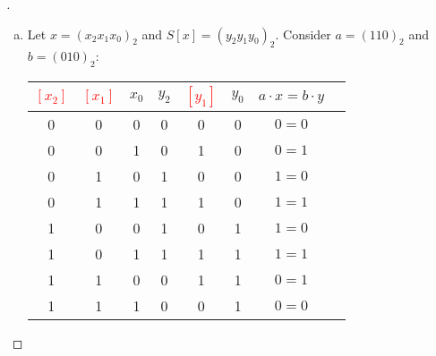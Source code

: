 \begin{enumerate}[\bf 1.]
\begin{proof}[\sol]
\begin{enumerate}[(a)]
			\newpage
			\item Let $x=(x_2x_1x_0)_2$ and $S[x]=(y_2y_1y_0)_2$. Consider $a=(110)_2$ and $b=(010)_2$: 
%					
%					
%					
%					
			\begin{table}[h!]\centering\renewcommand{\arraystretch}{1}
				\begin{tabular}{ccc|ccc|cc}
					\toprule[1.2pt]
					\textcolor{red}{$[x_2]$} & \textcolor{red}{$[x_1]$} & $x_0$ & $y_2$ & \textcolor{red}{$[y_1]$} & {$y_0$} & $a\cdot x=b\cdot y$ & \\
					\hline
					0 & 0 & 0 & 0 & 0 & 0 & $0=0$ & \textcolor{green}{\checkmark}\\
					0 & 0 & 1 & 0 & 1 & 0 & $0=1$ & \textcolor{red}{\xmark}\\
					0 & 1 & 0 & 1 & 0 & 0 & $1=0$ & \textcolor{red}{\xmark}\\
					0 & 1 & 1 & 1 & 1 & 0 & $1=1$ & \textcolor{green}{\checkmark}\\
					1 & 0 & 0 & 1 & 0 & 1 & $1=0$ & \textcolor{red}{\xmark}\\
					1 & 0 & 1 & 1 & 1 & 1 & $1=1$ & \textcolor{green}{\checkmark}\\
					1 & 1 & 0 & 0 & 1 & 1 & $0=1$ & \textcolor{red}{\xmark}\\
					1 & 1 & 1 & 0 & 0 & 1 & $0=0$ & \textcolor{green}{\checkmark}\\

\end{tabular}
\end{table}
\end{enumerate}
\end{proof}
\end{enumerate}
